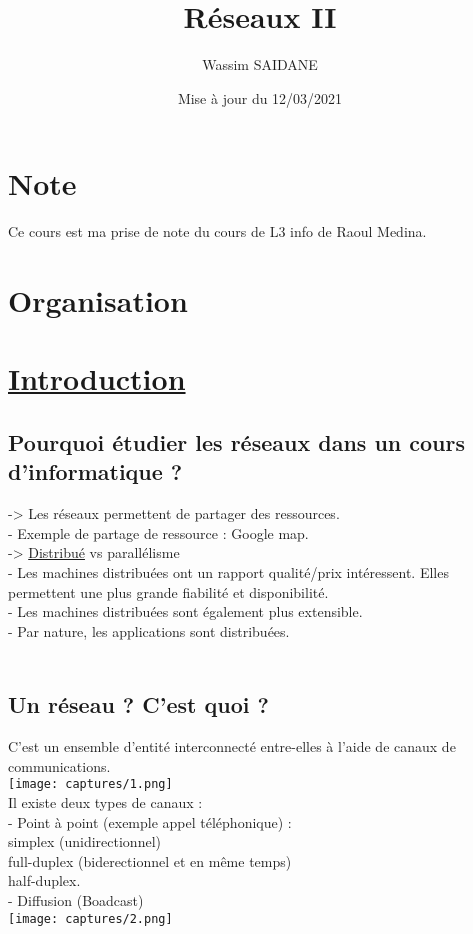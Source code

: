 \documentclass{article}
\title{Réseaux II}
\author{Wassim SAIDANE}
\date{Mise à jour du 12/03/2021}
\begin{document}
    \maketitle
    \tableofcontents
    \newpage
    \section*{Note}
    Ce cours est ma prise de note du cours de L3 info de Raoul Medina.
    \section*{Organisation}
    \section*{\underline{Introduction}}
    \subsection*{Pourquoi étudier les réseaux dans un cours d'informatique ?}  
    -> Les réseaux permettent de partager des ressources. \\
    - Exemple de partage de ressource : Google map. \\ 
    -> \underline{Distribué} vs parallélisme \\
    - Les machines distribuées ont un rapport qualité/prix intéressent.
    Elles permettent une plus grande fiabilité et disponibilité. \\  
    - Les machines distribuées sont également plus extensible. \\
    - Par nature, les applications sont distribuées. \\
    \\
    \subsection*{Un réseau ? C'est quoi ?} 
    C'est un ensemble d'entité interconnecté entre-elles à l'aide de canaux de communications. \\
    \texttt{[image: captures/1.png]} \\
    Il existe deux types de canaux : \\ 
    - Point à point (exemple appel téléphonique) : \\
      simplex (unidirectionnel) \\
      full-duplex (biderectionnel et en même temps) \\
      half-duplex. \\
    \newpage
    - Diffusion (Boadcast) \\
    \texttt{[image: captures/2.png]}
\end{document}
